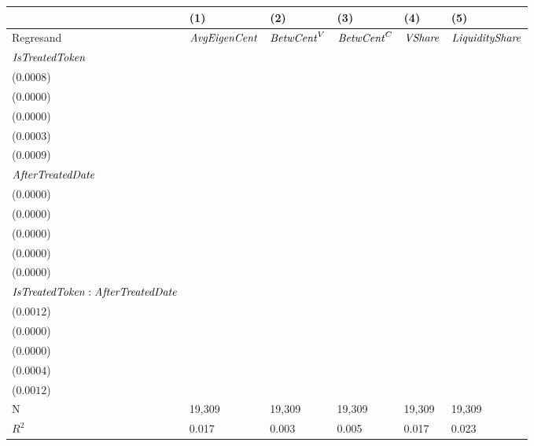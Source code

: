 \begin{tabular}{llllll}
\toprule
{} &                                      (1) &                                      (2) &                                      (3) &                                      (4) &                                      (5) \\
\midrule
Regresand                                     &                     ${\it AvgEigenCent}$ &                       ${\it BetwCent}^V$ &                       ${\it BetwCent}^C$ &                           ${\it VShare}$ &                   ${\it LiquidityShare}$ \\
${\it IsTreatedToken}$                        &  \makecell{$0.0043^{***}$ \\ ($0.0008$)} &     \makecell{$0.0000^{}$ \\ ($0.0000$)} &     \makecell{$0.0000^{}$ \\ ($0.0000$)} &  \makecell{$0.0015^{***}$ \\ ($0.0003$)} &  \makecell{$0.0047^{***}$ \\ ($0.0009$)} \\
${\it AfterTreatedDate}$                      &  \makecell{$0.0008^{***}$ \\ ($0.0000$)} &  \makecell{$0.0000^{***}$ \\ ($0.0000$)} &  \makecell{$0.0000^{***}$ \\ ($0.0000$)} &  \makecell{$0.0003^{***}$ \\ ($0.0000$)} &  \makecell{$0.0009^{***}$ \\ ($0.0000$)} \\
${\it IsTreatedToken}:{\it AfterTreatedDate}$ &  \makecell{$-0.0028^{**}$ \\ ($0.0012$)} &    \makecell{$-0.0000^{}$ \\ ($0.0000$)} &    \makecell{$-0.0000^{}$ \\ ($0.0000$)} &  \makecell{$-0.0010^{**}$ \\ ($0.0004$)} &    \makecell{$-0.0006^{}$ \\ ($0.0012$)} \\
\midrule N                                    &                                   19,309 &                                   19,309 &                                   19,309 &                                   19,309 &                                   19,309 \\
$R^2$                                         &                                    0.017 &                                    0.003 &                                    0.005 &                                    0.017 &                                    0.023 \\
\bottomrule
\end{tabular}
